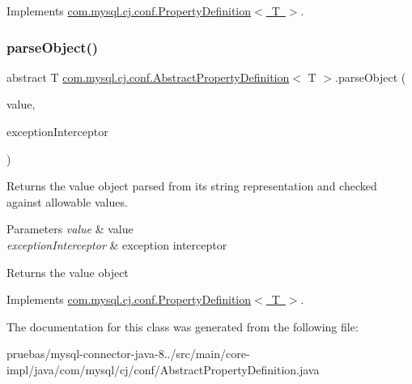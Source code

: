 Implements \mbox{\hyperlink{interfacecom_1_1mysql_1_1cj_1_1conf_1_1_property_definition_a72d0e665c12ca2bfa7c2fd6cf7d50656}{com.\+mysql.\+cj.\+conf.\+Property\+Definition$<$ T $>$}}.

\mbox{\label{classcom_1_1mysql_1_1cj_1_1conf_1_1_abstract_property_definition_aa8a990e4882d80051332cacda3886747}} 
\subsubsection{\texorpdfstring{parse\+Object()}{parseObject()}}
{\footnotesize\ttfamily abstract T \mbox{\hyperlink{classcom_1_1mysql_1_1cj_1_1conf_1_1_abstract_property_definition}{com.\+mysql.\+cj.\+conf.\+Abstract\+Property\+Definition}}$<$ T $>$.parse\+Object (\begin{DoxyParamCaption}\item[{String}]{value,  }\item[{\mbox{\hyperlink{interfacecom_1_1mysql_1_1cj_1_1exceptions_1_1_exception_interceptor}{Exception\+Interceptor}}}]{exception\+Interceptor }\end{DoxyParamCaption})\hspace{0.3cm}{\ttfamily [abstract]}}

Returns the value object parsed from it\textquotesingle{}s string representation and checked against allowable values.


\begin{DoxyParams}{Parameters}
{\em value} & value \\
\hline
{\em exception\+Interceptor} & exception interceptor\\
\hline
\end{DoxyParams}
\begin{DoxyReturn}{Returns}
the value object 
\end{DoxyReturn}


Implements \mbox{\hyperlink{interfacecom_1_1mysql_1_1cj_1_1conf_1_1_property_definition_a6abfb25b6102c876eddc4f10aca5687c}{com.\+mysql.\+cj.\+conf.\+Property\+Definition$<$ T $>$}}.



The documentation for this class was generated from the following file\+:\begin{DoxyCompactItemize}
\item 
pruebas/mysql-\/connector-\/java-\/8../src/main/core-\/impl/java/com/mysql/cj/conf/Abstract\+Property\+Definition.\+java\end{DoxyCompactItemize}
